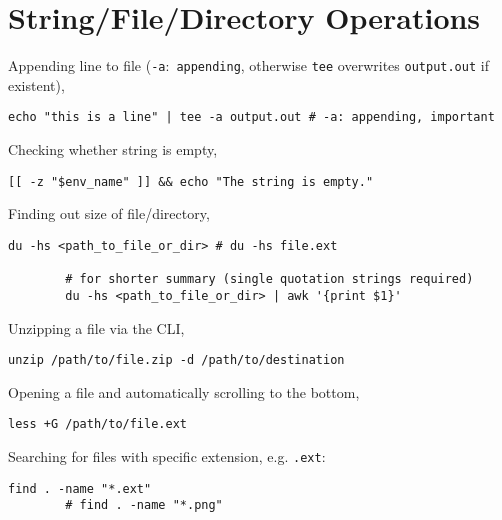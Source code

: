 \documentclass[12pt, a4paper]{scrbook}
\numberwithin{equation}{section}
\theoremstyle{definition}
\theoremstyle{definition}
\begin{document}
	\section{String/File/Directory Operations}
	
	Appending line to file (\texttt{-a}:~\texttt{appending}, otherwise \texttt{tee} overwrites \texttt{output.out} if existent),
	
	\begin{lstlisting}[style=mystylebash, label=alg:ubuntu__line_appending, xleftmargin=\parindent]
		echo "this is a line" | tee -a output.out # -a: appending, important
	\end{lstlisting}
	
	Checking whether string is empty,
	
	\begin{lstlisting}[style=mystylebash, label=alg:bash__empty_string_check, xleftmargin=\parindent]
		[[ -z "$env_name" ]] && echo "The string is empty."
	\end{lstlisting}
	
	Finding out size of file/directory,
	
	\begin{lstlisting}[style=mystylebash, label=alg:dir_size, xleftmargin=\parindent]
		du -hs <path_to_file_or_dir> # du -hs file.ext
		
		# for shorter summary (single quotation strings required)
		du -hs <path_to_file_or_dir> | awk '{print $1}'
	\end{lstlisting}

	Unzipping a file via the CLI, 
	
	\begin{lstlisting}[style=mystylebash, label=alg:bash_unzip, xleftmargin=\parindent]
		unzip /path/to/file.zip -d /path/to/destination
	\end{lstlisting}

	Opening a file and automatically scrolling to the bottom,
	
	\begin{lstlisting}[style=mystylebash, label=alg:less__bottom_scroll, xleftmargin=\parindent]
		less +G /path/to/file.ext
	\end{lstlisting}

	Searching for files with specific extension, e.g. \texttt{.ext}: 
	
	\begin{lstlisting}[style=mystylebash, label=alg:bash_find, xleftmargin=\parindent]
		find . -name "*.ext"
		# find . -name "*.png"
	\end{lstlisting}
	
\end{document}
